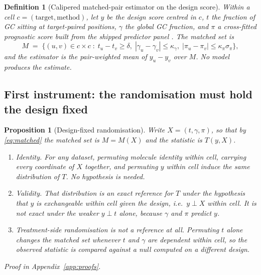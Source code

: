 \documentclass[11pt]{article}
\newtheorem{proposition}{Proposition}
\newtheorem{definition}{Definition}
\begin{document}
\begin{definition}[Calipered matched-pair estimator on the design score]
\label{def:mp}
Within a cell $c=(\text{target},\text{method})$, let $y$ be the design score centred in $c$, $t$
the fraction of GC sitting at target-paired positions, $\gamma$ the global GC fraction, and $\pi$ a
cross-fitted prognostic score built from the shipped predictor panel \citep{hansen2008prognostic}.
The matched set is
\begin{equation}
M \;=\; \bigl\{(u,v)\in c\times c \;:\; t_u-t_v\ge\delta,\;
|\gamma_u-\gamma_v|\le\kappa_\gamma,\; |\pi_u-\pi_v|\le\kappa_\pi\sigma_\pi\bigr\},
\label{eq:matched}
\end{equation}
and the estimator is the pair-weighted mean of $y_u-y_v$ over $M$. No model produces the estimate.
\end{definition}

\subsection{First instrument: the randomisation must hold the design fixed}
\label{sec:inference}

\begin{proposition}[Design-fixed randomisation]
\label{prop:null}
Write $X=(t,\gamma,\pi)$, so that by \eqref{eq:matched} the matched set is $M=M(X)$ and the
statistic is $T(y,X)$.
\begin{enumerate}[leftmargin=2.4em,itemsep=1pt,topsep=2pt,label=(\roman*)]
\item \emph{Identity.} For any dataset, permuting molecule identity within cell, carrying every
coordinate of $X$ together, and permuting $y$ within cell induce the same distribution of $T$.
No hypothesis is needed.
\item \emph{Validity.} That distribution is an exact reference for $T$ under the hypothesis that
$y$ is \emph{exchangeable within cell given the design}, i.e.\ $y\perp X$ within cell. It is not
exact under the weaker $y\perp t$ alone, because $\gamma$ and $\pi$ predict $y$.
\item \emph{Treatment-side randomisation is not a reference at all.} Permuting $t$ alone changes
the matched set whenever $t$ and $\gamma$ are dependent within cell, so the observed statistic is
compared against a null computed on a different design.
\end{enumerate}
\end{proposition}

\noindent\emph{Proof in Appendix~\ref{app:proofs}.}
\end{document}
